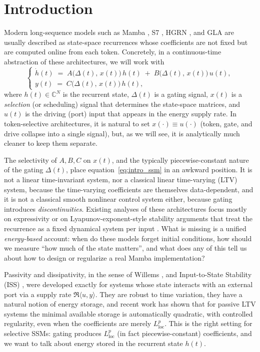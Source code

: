\documentclass[10pt]{article} %
\def\eqref#1{equation~\ref{#1}}
\newcommand{\loc}{\mathrm{loc}}                         %
\theoremstyle{definition}
\begin{document}
\section{Introduction}
\label{sec:introduction}
Modern long-sequence models such as Mamba \citep{gu2024mamba}, S7 \citep{Soydan2024S7SA}, HGRN \citep{qin2024hgrn2}, and GLA \citep{yang2024gla} are usually described as state-space recurrences whose coefficients are not fixed but are computed online from each token. Concretely, in a continuous-time abstraction of these architectures, we will work with
\begin{equation}
\label{eq:intro_ssm}
\begin{cases}
\dot{h}(t) \;=\; A\!\bigl(\Delta(t),\,x(t)\bigr)\,h(t)
\;+\; B\!\bigl(\Delta(t),\,x(t)\bigr)\,u(t),\\
y(t) \;=\; C\!\bigl(\Delta(t),\,x(t)\bigr)\,h(t),
\end{cases}
\end{equation}
where $h(t)\in\mathbb{C}^N$ is the recurrent state, $\Delta(t)$ is a gating signal, $x(t)$ is a \emph{selection} (or scheduling) signal that determines the state-space matrices, and $u(t)$ is the driving (port) input that appears in the energy supply rate. In token-selective architectures, it is natural to set $x(\cdot) \equiv u(\cdot)$ (token, gate, and drive collapse into a single signal), but, as we will see, it is analytically much cleaner to keep them separate.

The selectivity of $A,B,C$ on $x(t)$, and the typically piecewise-constant nature of the gating $\Delta(t)$, place \eqref{eq:intro_ssm} in an awkward position. It is not a linear time-invariant system, nor a classical linear time-varying (LTV) system, because the time-varying coefficients are themselves data-dependent, and it is not a classical smooth nonlinear control system either, because gating introduces \emph{discontinuities}. Existing analyses of these architectures focus mostly on expressivity \citep{cirone2024theoretical, zubic2025limits, zubic2026expressive} or on Lyapunov-exponent-style stability arguments that treat the recurrence as a fixed dynamical system per input \citep{halloran2024mamba}. What is missing is a unified \emph{energy-based} account: when do these models forget initial conditions, how should we measure ``how much of the state matters'', and what does any of this tell us about how to design or regularize a real Mamba implementation?

Passivity and dissipativity, in the sense of Willems \citep{Willems1972DissipativeDS, van2000l2}, and Input-to-State Stability (ISS) \citep{Sontag1989SmoothSF, Sontag1995OnCO, Jiang1999InputtostateSF}, were developed exactly for systems whose state interacts with an external port via a supply rate $\Re\langle u, y\rangle$. They are robust to time variation, they have a natural notion of energy storage, and recent work \citep{MorandinHinsen2024} has shown that for passive LTV systems the minimal available storage is automatically quadratic, with controlled regularity, even when the coefficients are merely $L^p_{\loc}$. This is the right setting for selective SSMs: gating produces $L^p_{\loc}$ (in fact piecewise-constant) coefficients, and we want to talk about energy stored in the recurrent state $h(t)$.
\end{document}
